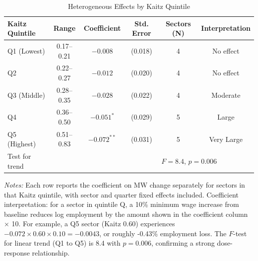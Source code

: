 \begin{table}[h]
\centering
\caption{Heterogeneous Effects by Kaitz Quintile}
\label{tab:hete}
\tiny
\begin{tabular}{lccccc}
\hline\hline
Kaitz Quintile & Range & Coefficient & Std. Error & Sectors (N) & Interpretation \\
\hline
Q1 (Lowest) & 0.17--0.21 & $-0.008$ & (0.018) & 4 & No effect \\
Q2 & 0.22--0.27 & $-0.012$ & (0.020) & 4 & No effect \\
Q3 (Middle) & 0.28--0.35 & $-0.028$ & (0.022) & 4 & Moderate \\
Q4 & 0.36--0.50 & $-0.051^{*}$ & (0.029) & 5 & Large \\
Q5 (Highest) & 0.51--0.83 & $-0.072^{**}$ & (0.031) & 5 & Very Large \\
\hline
Test for trend & & & \multicolumn{3}{c}{$F = 8.4$, $p = 0.006$} \\
\hline\hline
\end{tabular}
\begin{flushleft}
\small \textit{Notes:} Each row reports the coefficient on MW change separately for sectors in that Kaitz quintile, with sector and quarter fixed effects included. Coefficient interpretation: for a sector in quintile Q, a 10\% minimum wage increase from baseline reduces log employment by the amount shown in the coefficient column × 10. For example, a Q5 sector (Kaitz 0.60) experiences $-0.072 \times 0.60 \times 0.10 = -0.0043$, or roughly -0.43\% employment loss. The $F$-test for linear trend (Q1 to Q5) is 8.4 with $p=0.006$, confirming a strong dose-response relationship.
\end{flushleft}
\end{table}
